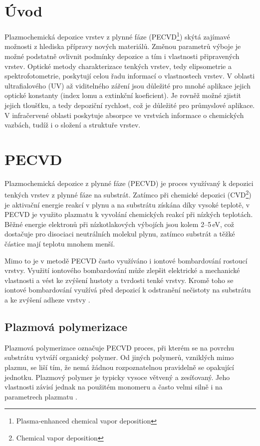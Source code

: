 \documentclass[12pt,oneside,final]{fithesis2}
\begin{document}
\MainMatter

\tableofcontents %

\chapter{Úvod}
Plazmochemická depozice vrstev z plynné fáze (PECVD\footnote{Plasma-enhanced chemical vapor deposition}) skýtá zajímavé možnosti z hlediska přípravy nových materiálů. Změnou parametrů výboje je možné podstatně ovlivnit podmínky depozice a tím i vlastnosti připravených vrstev. Optické metody charakterizace tenkých vrstev, tedy elipsometrie a spektrofotometrie, poskytují celou řadu informací o vlastnostech vrstev. V oblasti ultrafialového (UV) až viditelného záření jsou důležité pro mnohé aplikace jejich optické konstanty (index lomu a extinkční koeficient). Je rovněž možné zjistit jejich tloušťku, a tedy depoziční rychlost, což je důležité pro průmyslové aplikace. V infračervené oblasti poskytuje absorpce ve vrstvách informace o chemických vazbách, tudíž i o složení a struktuře vrstev.


\chapter{PECVD}

Plazmochemická depozice z plynné fáze (PECVD) je proces využívaný k depozici tenkých vrstev z plynné fáze na substrát. Zatímco při chemické depozici (CVD\footnote{Chemical vapor deposition}) je aktivační energie reakcí v plynu a na substrátu získána díky vysoké teplotě, v PECVD je využito plazmatu k vyvolání chemických reakcí při nízkých teplotách. Běžné energie elektronů při nízkotlakových výbojích jsou kolem 2--5\,eV, což dostačuje pro disociaci neutrálních molekul plynu, zatímco substrát a těžké částice mají teplotu mnohem menší. 
 
Mimo to je v metodě PECVD často využíváno i iontové bombardování rostoucí vrstvy. Využití iontového bombardování může zlepšit elektrické a mechanické vlastnosti a vést ke zvýšení hustoty a tvrdosti tenké vrstvy. Kromě toho se iontové bombardování využívá před depozicí k odstranění nečistoty na substrátu a ke zvýšení adheze vrstvy \cite{smith, liebermanPECVD}. 

\section{Plazmová polymerizace}

Plazmová polymerizace označuje PECVD proces, při kterém se na povrchu substrátu vytváří organický polymer. Od jiných polymerů, vzniklých mimo plazmu, se liší tím, že nemá žádnou rozpoznatelnou pravidelně se opakující jednotku. Plazmový polymer je typicky vysoce větvený a zesíťovaný. Jeho vlastnosti závisí jednak na použitém monomeru a často velmi silně i na parametrech plazmatu \cite{yasudapoly}.
 
\end{document}
